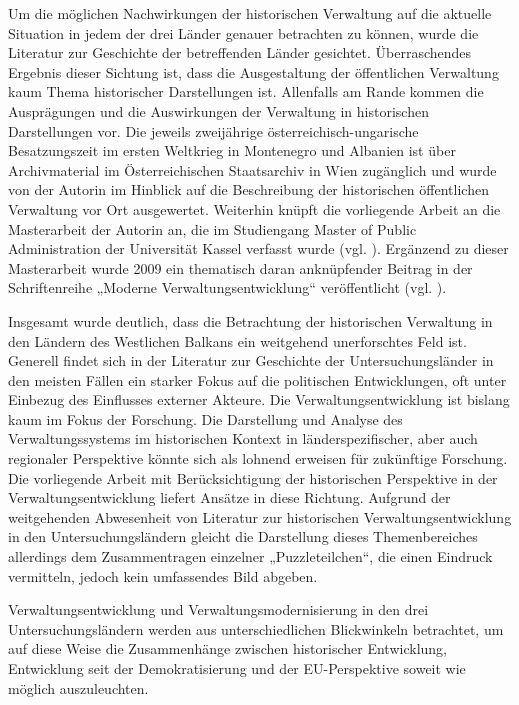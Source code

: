 \par
Um die möglichen Nachwirkungen der historischen Verwaltung auf die aktuelle Situation in jedem der drei Länder genauer betrachten zu können, wurde die Literatur zur Geschichte der betreffenden Länder gesichtet. Überraschendes Ergebnis dieser Sichtung ist, dass die Ausgestaltung der öffentlichen Verwaltung kaum Thema historischer Darstellungen ist. Allenfalls am Rande kommen die Ausprägungen und die Auswirkungen der Verwaltung in historischen Darstellungen vor. Die jeweils zweijährige österreichisch-ungarische Besatzungszeit im ersten Weltkrieg in Montenegro und Albanien ist über Archivmaterial im Österreichischen Staatsarchiv in Wien zugänglich und wurde von der Autorin im Hinblick auf die Beschreibung der historischen öffentlichen Verwaltung vor Ort ausgewertet. Weiterhin knüpft die vorliegende Arbeit an die Masterarbeit der Autorin an, die im Studiengang Master of Public Administration der Universität Kassel verfasst wurde (vgl. \cite{vollmer07}). Ergänzend zu dieser Masterarbeit wurde 2009 ein thematisch daran anknüpfender Beitrag in der Schriftenreihe „Moderne Verwaltungsentwicklung“ veröffentlicht (vgl. \cite{vollmer09}).
\par
Insgesamt wurde deutlich, dass die Betrachtung der historischen Verwaltung in den Ländern des Westlichen Balkans ein weitgehend unerforschtes Feld ist. Generell findet sich in der Literatur zur Geschichte der Untersuchungsländer in den meisten Fällen ein starker Fokus auf die politischen Entwicklungen, oft unter Einbezug des Einflusses externer Akteure. Die Verwaltungsentwicklung ist bislang kaum im Fokus der Forschung. Die Darstellung und Analyse des Verwaltungssystems im historischen Kontext in länderspezifischer, aber auch regionaler Perspektive könnte sich als lohnend erweisen für zukünftige Forschung. Die vorliegende Arbeit mit Berücksichtigung der historischen Perspektive in der Verwaltungsentwicklung liefert Ansätze in diese Richtung. Aufgrund der weitgehenden Abwesenheit von Literatur zur historischen Verwaltungsentwicklung in den Untersuchungsländern gleicht die Darstellung dieses Themenbereiches allerdings dem Zusammentragen einzelner „Puzzleteilchen“, die einen Eindruck vermitteln, jedoch kein umfassendes Bild abgeben.
\par
Verwaltungsentwicklung und Verwaltungsmodernisierung in den drei Untersuchungsländern werden aus unterschiedlichen Blickwinkeln betrachtet, um auf diese Weise die Zusammenhänge zwischen historischer Entwicklung, Entwicklung seit der Demokratisierung und der EU-Perspektive soweit wie möglich auszuleuchten.

